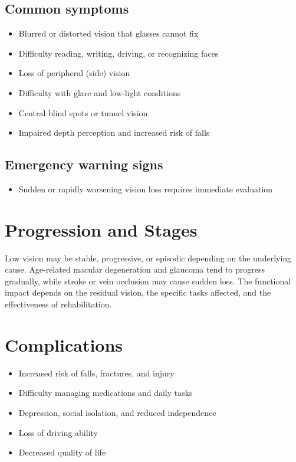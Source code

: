 \subsection{Common symptoms}
\begin{itemize}[noitemsep]
  \item Blurred or distorted vision that glasses cannot fix
  \item Difficulty reading, writing, driving, or recognizing faces
  \item Loss of peripheral (side) vision
  \item Difficulty with glare and low-light conditions
  \item Central blind spots or tunnel vision
  \item Impaired depth perception and increased risk of falls
\end{itemize}
\subsection{Emergency warning signs}
\begin{itemize}[noitemsep]
  \item Sudden or rapidly worsening vision loss requires immediate evaluation
\end{itemize}
\section{Progression and Stages}
Low vision may be stable, progressive, or episodic depending on the underlying cause. Age-related macular degeneration and glaucoma tend to progress gradually, while stroke or vein occlusion may cause sudden loss. The functional impact depends on the residual vision, the specific tasks affected, and the effectiveness of rehabilitation.
\section{Complications}
\begin{itemize}[noitemsep]
  \item Increased risk of falls, fractures, and injury
  \item Difficulty managing medications and daily tasks
  \item Depression, social isolation, and reduced independence
  \item Loss of driving ability
  \item Decreased quality of life
\end{itemize}
